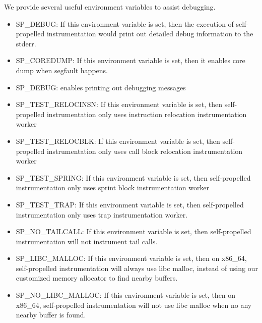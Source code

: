 We provide several useful environment variables to assist debugging.
\begin{itemize}
\item SP\_DEBUG: If this environment variable is set, then the execution of
  self-propelled instrumentation would print out detailed debug information to
  the stderr.
\item SP\_COREDUMP: If this environment variable is set, then it enables core
  dump when segfault happens.
\item SP\_DEBUG: enables printing out debugging messages
\item SP\_TEST\_RELOCINSN: If this environment variable is set, then self-propelled
  instrumentation only uses instruction relocation instrumentation worker
\item SP\_TEST\_RELOCBLK: If this environment variable is set, then self-propelled
  instrumentation only uses call block relocation instrumentation worker
\item SP\_TEST\_SPRING: If this environment variable is set, then self-propelled
  instrumentation only uses sprint block instrumentation worker
\item SP\_TEST\_TRAP: If this environment variable is set, then self-propelled
  instrumentation only uses trap instrumentation worker.
\item SP\_NO\_TAILCALL: If this environment variable is set, then self-propelled
  instrumentation will not instrument tail calls.
\item SP\_LIBC\_MALLOC: If this environment variable is set, then on x86\_64,
  self-propelled instrumentation will always use libc malloc, instead of using
  our customized memory allocator to find nearby buffers.
\item SP\_NO\_LIBC\_MALLOC: If this environment variable is set, then on
  x86\_64, self-propelled instrumentation will not use libc malloc when no any
  nearby buffer is found.
\end{itemize}
